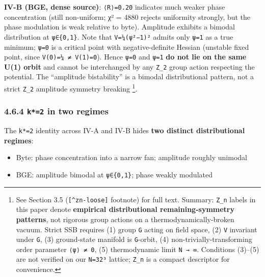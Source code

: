 \documentclass[
]{article}
\providecommand{\tightlist}{%
  \setlength{\itemsep}{0pt}\setlength{\parskip}{0pt}}
\begin{document}
\textbf{IV-B (BGE, dense source)}: \texttt{⟨\textbar{}R\textbar{}⟩=0.20}
indicates much weaker phase concentration (still non-uniform; χ² = 4880
rejects uniformity strongly, but the phase modulation is weak relative
to byte). Amplitude exhibits a bimodal distribution at
\texttt{\textbar{}ψ\textbar{}∈\{0,1\}}. Note that
\texttt{V=¼(\textbar{}ψ\textbar{}²−1)²} admits only
\texttt{\textbar{}ψ\textbar{}=1} as a true minimum;
\texttt{\textbar{}ψ\textbar{}=0} is a critical point with
negative-definite Hessian (unstable fixed point, since
\texttt{V(0)=¼\ ≠\ V(1)=0}). Hence \texttt{\textbar{}ψ\textbar{}=0} and
\texttt{\textbar{}ψ\textbar{}=1} \textbf{do not lie on the same U(1)
orbit} and cannot be interchanged by any \texttt{Z\_2} group action
respecting the potential. The ``amplitude bistability'' is a bimodal
distributional pattern, not a strict \texttt{Z\_2} amplitude symmetry
breaking \footnote{See Section 3.5 (\texttt{{[}\^{}zn-loose{]}}
  footnote) for full text. Summary: \texttt{Z\_n} labels in this paper
  denote \textbf{empirical distributional remaining-symmetry patterns},
  not rigorous group actions on a thermodynamically-broken vacuum.
  Strict SSB requires (1) group \texttt{G} acting on field space, (2)
  \texttt{V} invariant under \texttt{G}, (3) ground-state manifold is
  \texttt{G}-orbit, (4) non-trivially-transforming order parameter
  \texttt{⟨ψ⟩\ ≠\ 0}, (5) thermodynamic limit \texttt{N\ →\ ∞}.
  Conditions (3)--(5) are not verified on our \texttt{N=32³} lattice;
  \texttt{Z\_n} is a compact descriptor for convenience.}.

\hypertarget{k2-in-two-regimes}{%
\subsubsection{\texorpdfstring{4.6.4 \texttt{k*=2} in two
regimes}{4.6.4 k*=2 in two regimes}}\label{k2-in-two-regimes}}

The \texttt{k*=2} identity across IV-A and IV-B hides \textbf{two
distinct distributional regimes}:

\begin{itemize}
\tightlist
\item
  Byte: phase concentration into a narrow fan; amplitude roughly
  unimodal
\item
  BGE: amplitude bimodal at \texttt{\textbar{}ψ\textbar{}∈\{0,1\}};
  phase weakly modulated
\end{itemize}
\end{document}
